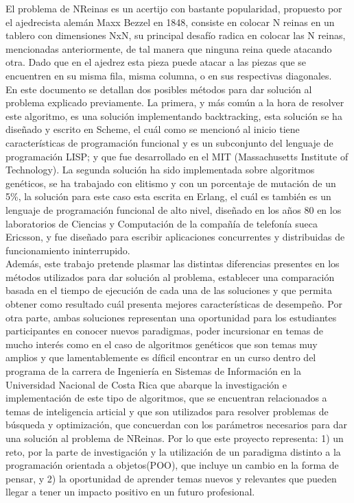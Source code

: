 \documentclass[12pt,a4paper]{article}
\begin{document}
 	El problema de NReinas es un acertijo con bastante popularidad, propuesto por el ajedrecista alemán Maxx Bezzel en 1848, consiste en colocar N reinas en un tablero con dimensiones NxN, su principal desafío radica en colocar las N reinas, mencionadas anteriormente, de tal manera que ninguna reina quede atacando otra. Dado que en el ajedrez esta pieza puede atacar a las piezas que se encuentren en su misma fila, misma columna, o en sus respectivas diagonales. \\
 	
 	En este documento se detallan dos posibles métodos para dar solución al problema explicado previamente. La primera, y más común a la hora de resolver este algoritmo, es una solución implementando backtracking, esta solución se ha diseñado y escrito en Scheme, el cuál como se mencionó al inicio tiene características de programación funcional y es un subconjunto del lenguaje de programación LISP; y que fue desarrollado en el MIT (Massachusetts Institute of Technology). La segunda solución ha sido implementada sobre algoritmos genéticos, se ha trabajado con elitismo y con un porcentaje de mutación de un 5\%, la solución para este caso esta escrita en Erlang, el cuál es también es un lenguaje de programación funcional de alto nivel, diseñado en los años 80 en los laboratorios de Ciencias y Computación de la compañía de telefonía sueca Ericsson, y fue diseñado para escribir aplicaciones concurrentes y distribuidas de funcionamiento ininterrupido. \\
 	
 	Además, este trabajo pretende plasmar las distintas diferencias presentes en los métodos utilizados para dar solución al problema, establecer una comparación basada en el tiempo de ejecución de cada una de las soluciones y que permita obtener como resultado cuál presenta mejores características de desempeño. Por otra parte, ambas soluciones representan una oportunidad para los estudiantes participantes en conocer nuevos paradigmas, poder incursionar en temas de mucho interés como en el caso de algoritmos genéticos que  son temas muy amplios y que lamentablemente es díficil encontrar en un curso dentro del programa de la carrera de Ingeniería en Sistemas de Información en la Universidad Nacional de Costa Rica que abarque la investigación e implementación de este tipo de algoritmos, que se encuentran relacionados a temas de inteligencia articial y que son utilizados para resolver problemas de búsqueda y optimización, que concuerdan con los parámetros necesarios para dar una solución al problema de NReinas. Por lo que este proyecto representa: 1) un reto, por la parte de investigación y la utilización de un paradigma distinto a la programación orientada a objetos(POO), que incluye un cambio en la forma de pensar, y 2) la oportunidad de aprender temas nuevos y relevantes que pueden llegar a tener un impacto positivo en un futuro profesional. \\
 	
\end{document}
